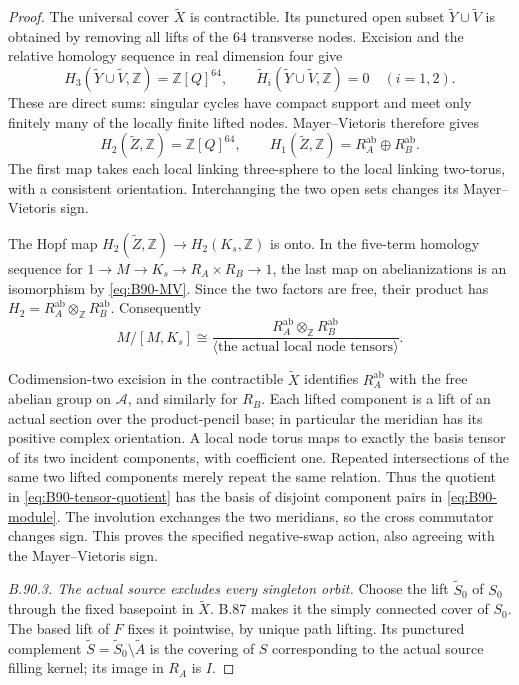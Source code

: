 \begin{proof}
The universal cover $\widetilde X$ is contractible. Its punctured
open subset
$\widetilde Y\cup\widetilde V$ is obtained by removing all lifts
of the $64$ transverse nodes. Excision and the relative homology
sequence in real dimension four give
\[
 H_3(\widetilde Y\cup\widetilde V,\mathbb Z)
       =\mathbb Z[Q]^{64},\qquad
 \widetilde H_i(\widetilde Y\cup\widetilde V,\mathbb Z)=0
       \quad(i=1,2).
\]
These are direct sums: singular cycles have compact support and meet
only finitely many of the locally finite lifted nodes. Mayer--Vietoris
therefore gives
\begin{equation}\label{eq:B90-MV}
 H_2(\widetilde Z,\mathbb Z)=\mathbb Z[Q]^{64},
 \qquad
 H_1(\widetilde Z,\mathbb Z)=R_A^{\mathrm{ab}}\oplus R_B^{\mathrm{ab}}.
\end{equation}
The first map takes each local linking three-sphere to the local
linking two-torus, with a consistent orientation. Interchanging the
two open sets changes its Mayer--Vietoris sign.

The Hopf map $H_2(\widetilde Z,\mathbb Z)\to H_2(K_s,\mathbb Z)$
is onto. In the five-term homology sequence for
$1\to M\to K_s\to R_A\times R_B\to1$, the last map on
abelianizations is an isomorphism by \eqref{eq:B90-MV}. Since the
two factors are free, their product has
$H_2=R_A^{\mathrm{ab}}\otimes_{\mathbb Z}R_B^{\mathrm{ab}}$.
Consequently
\begin{equation}\label{eq:B90-tensor-quotient}
 M/[M,K_s]\cong
 \frac{R_A^{\mathrm{ab}}\otimes_{\mathbb Z}R_B^{\mathrm{ab}}}
      {\langle\text{the actual local node tensors}\rangle}.
\end{equation}

Codimension-two excision in the contractible $\widetilde X$ identifies
$R_A^{\mathrm{ab}}$ with the free abelian group on $\mathscr A$,
and similarly for $R_B$. Each lifted component is a lift of an
actual section over the product-pencil base; in particular the
meridian has its positive complex orientation. A local node torus
maps to exactly the basis tensor of its two incident components,
with coefficient one. Repeated intersections of the same two lifted
components merely repeat the same relation. Thus the quotient in
\eqref{eq:B90-tensor-quotient} has the basis of disjoint component
pairs in \eqref{eq:B90-module}. The involution exchanges the two
meridians, so the cross commutator changes sign. This proves the
specified negative-swap action, also agreeing with the
Mayer--Vietoris sign.

\emph{B.90.3. The actual source excludes every singleton orbit.}
Choose the lift $\widetilde S_0$ of $S_0$ through the fixed
basepoint in $\widetilde X$. B.87 makes it the simply connected
cover of $S_0$. The based lift of $F$ fixes it pointwise, by unique
path lifting. Its punctured complement
$\widetilde S=\widetilde S_0\setminus\widetilde A$ is the
covering of $S$ corresponding to the actual source filling kernel;
its image in $R_A$ is $I$.


\end{proof}
